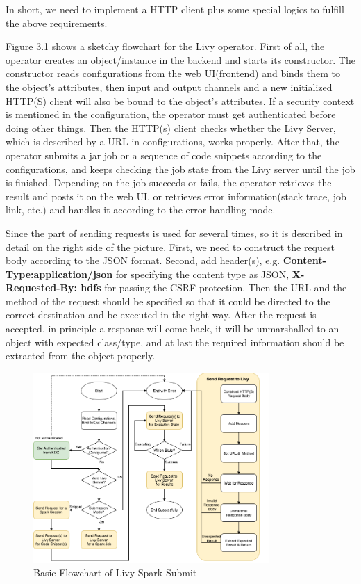 \documentclass[article,colorback,accentcolor=tud4c]{tudreport}
\begin{document}
	In short, we need to implement a HTTP client plus some special logics to fulfill the above requirements. 
	
	Figure 3.1 shows a sketchy flowchart for the Livy operator. First of all, the operator creates an object/instance in the backend and starts its constructor. The constructor reads configurations from the web UI(frontend) and binds them to the object's attributes, then input and output channels and a new initialized HTTP(S) client will also be bound to the object's attributes. If a security context is mentioned in the configuration, the operator must get authenticated before doing other things. Then the HTTP(s) client checks whether the Livy Server, which is described by a URL in configurations, works properly. After that, the operator submits a jar job or a sequence of code snippets according to the configurations, and keeps checking the job state from the Livy server until the job is finished. Depending on the job succeeds or fails, the operator retrieves the result and posts it on the web UI, or retrieves error information(stack trace, job link, etc.) and handles it according to the error handling mode.
	
	Since the part of sending requests is used for several times, so it is described in detail on the right side of the picture. First, we need to construct the request body according to the JSON format. Second, add header(s), e.g. \textbf{Content-Type:application/json} for specifying the content type as JSON, \textbf{X-Requested-By: hdfs} for passing the CSRF protection. Then the URL and the method of the request should be specified so that it could be directed to the correct destination and be executed in the right way. After the request is accepted, in principle a response will come back, it will be unmarshalled to an object with expected class/type, and at last the required information should be extracted from the object properly.
	
	\begin{figure}[!h]
		\centering
		\includegraphics[width=0.8\textwidth]{flowchart}
		\caption{Basic Flowchart of Livy Spark Submit}
	\end{figure}
	
\end{document}
